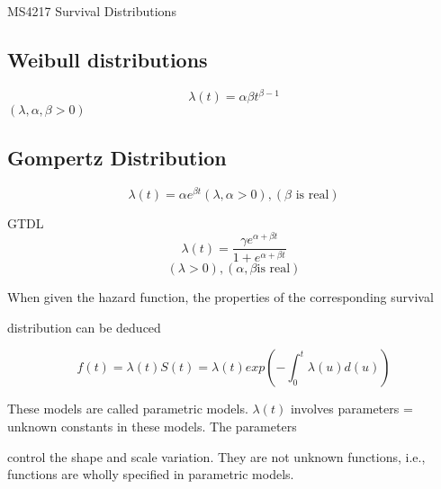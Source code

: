 MS4217 Survival Distributions


\subsection*{Weibull distributions} \[ \lambda(t) = \alpha \beta t^{\beta -1}   \]     $(\lambda , \alpha, \beta > 0)$


\subsection*{Gompertz Distribution} \[ \lambda(t) = \alpha e^{\beta t}           (\lambda , \alpha > 0), ( \beta \mbox{ is real})\]


GTDL   \[  \lambda(t) = \frac{\gamma e^{\alpha+\beta t}}{1+e^{\alpha+\beta t}} \]            \[         (\lambda > 0),(\alpha , \beta \mbox{is real})\]


When given the hazard function, the properties of the corresponding survival

distribution can be deduced

\[
f(t)=\lambda(t)S(t) = \lambda(t) exp(-\int_0^t \lambda(u)d(u))
\]

These models are called parametric models. $\lambda(t)$ involves parameters = unknown constants in these models. The parameters

control the shape and scale variation. They are not unknown functions, i.e., functions are wholly specified in parametric models.

